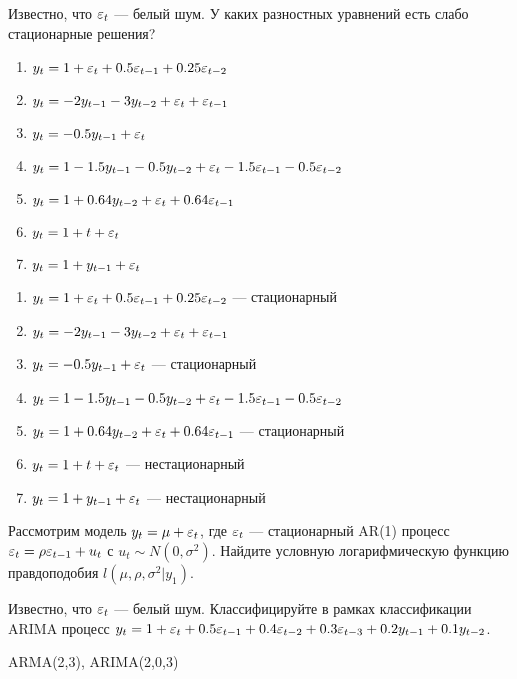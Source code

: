 \begin{problem}
Известно, что $\varepsilon_t$ — белый шум. У каких разностных уравнений есть слабо стационарные решения?
\begin{enumerate}
\item $y_t=1+\varepsilon_t+0.5\varepsilon_{t-1}+0.25\varepsilon_{t-2}$
\item $y_t=-2y_{t-1}-3y_{t-2}+\varepsilon_t+\varepsilon_{t-1}$
\item $y_t=-0.5y_{t-1} + \varepsilon_t$
\item $y_t=1-1.5 y_{t-1} - 0.5 y_{t-2} + \varepsilon_t - 1.5\varepsilon_{t-1} - 0.5\varepsilon_{t-2}$
\item $y_t=1+0.64y_{t-2}+\varepsilon_t+0.64\varepsilon_{t-1}$
\item $y_t=1+t+\varepsilon_t$
\item $y_t=1+y_{t-1}+\varepsilon_t$
\end{enumerate}
\begin{sol}

\begin{enumerate}
\item $y_t=1+\varepsilon_t+0.5\varepsilon_{t-1}+0.25\varepsilon_{t-2}$ — стационарный
\item $y_t=-2y_{t-1}-3y_{t-2}+\varepsilon_t+\varepsilon_{t-1}$
\item $y_t=-0.5y_{t-1} + \varepsilon_t$ — стационарный
\item $y_t=1-1.5 y_{t-1} - 0.5 y_{t-2} + \varepsilon_t - 1.5\varepsilon_{t-1} - 0.5\varepsilon_{t-2}$
\item $y_t=1+0.64y_{t-2}+\varepsilon_t+0.64\varepsilon_{t-1}$ — стационарный
\item $y_t=1+t+\varepsilon_t$ — нестационарный
\item $y_t=1+y_{t-1}+\varepsilon_t$ — нестационарный
\end{enumerate}
\end{sol}
\end{problem}



\begin{problem}
Рассмотрим модель $y_t=\mu + \varepsilon_t$, где $\varepsilon_t$ — стационарный AR(1) процесс $\varepsilon_t=\rho \varepsilon_{t-1} + u_t$ с $u_t \sim N(0,\sigma^2)$. Найдите условную логарифмическую функцию правдоподобия $l(\mu, \rho, \sigma^2 | y_1)$.
\begin{sol}

\end{sol}
\end{problem}

\begin{problem}
Известно, что $\varepsilon_t$ — белый шум. Классифицируйте в рамках классификации ARIMA процесс $y_t=1+\varepsilon_t + 0.5\varepsilon_{t-1} + 0.4\varepsilon_{t-2} + 0.3\varepsilon_{t-3} + 0.2y_{t-1} + 0.1y_{t-2}$.
\begin{sol}

ARMA(2,3), ARIMA(2,0,3)
\end{sol}
\end{problem}


